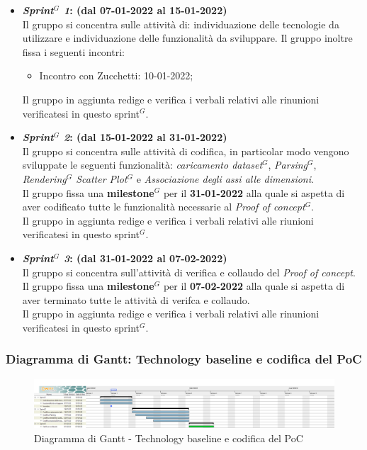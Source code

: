 \begin{itemize}
    \item \textbf{\textit{Sprint$^{G}$ 1}: (dal 07-01-2022 al 15-01-2022)}\\
    Il gruppo si concentra sulle attività di: individuazione delle tecnologie da utilizzare e individuazione delle funzionalità da sviluppare.
    Il gruppo inoltre fissa i seguenti incontri:
    \begin{itemize}
        \item Incontro con Zucchetti: 10-01-2022;
    \end{itemize}
    Il gruppo in aggiunta redige e verifica i verbali relativi alle rinunioni verificatesi in questo sprint$^{G}$.

    \item \textbf{\textit{Sprint$^{G}$ 2}: (dal 15-01-2022 al 31-01-2022)}\\
    Il gruppo si concentra sulle attività di codifica, in particolar modo vengono sviluppate le seguenti funzionalità: \textit{caricamento dataset$^{G}$}, \textit{Parsing$^{G}$}, \textit{Rendering$^{G}$ Scatter Plot$^{G}$} e \textit{Associazione degli assi alle dimensioni}.\\
    Il gruppo fissa una \textbf{milestone$^{G}$} per il \textbf{31-01-2022} alla quale si aspetta di aver codificato tutte le funzionalità necessarie al \textit{Proof of concept$^{G}$}.\\
    Il gruppo in aggiunta redige e verifica i verbali relativi alle riunioni verificatesi in questo sprint$^{G}$.

    \item \textbf{\textit{Sprint$^{G}$ 3}: (dal 31-01-2022 al 07-02-2022)}\\
    Il gruppo si concentra sull'attività di verifica e collaudo del \textit{Proof of concept}.\\
    Il gruppo fissa una \textbf{milestone$^{G}$} per il \textbf{07-02-2022} alla quale si aspetta di aver terminato tutte le attività di verifca e collaudo.\\
    Il gruppo in aggiunta redige e verifica i verbali relativi alle rinunioni verificatesi in questo sprint$^{G}$.
\end{itemize}

\subsubsection{Diagramma di Gantt: Technology baseline e codifica del PoC}
\begin{figure}[h!]
    \centering
    \includegraphics[scale=0.22]{../../assets/Diagrammi_Gantt/TB.png}
    \caption{Diagramma di Gantt - Technology baseline e codifica del PoC}
\end{figure}